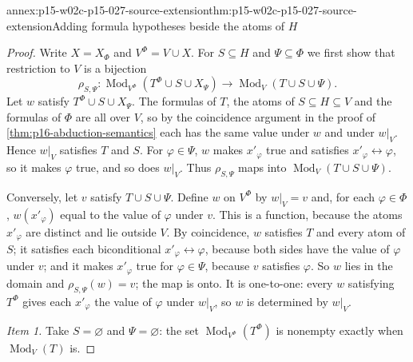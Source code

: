 \begin{annexitem}{annex:p15-w02c-p15-027-source-extension}{thm:p15-w02c-p15-027-source-extension}{Adding formula hypotheses beside the atoms of \texorpdfstring{\(H\)}{H}}
\begin{proof}
Write \(X=X_\Phi\) and \(V^{\Phi}=V\cup X\). For \(S\subseteq H\) and
\(\Psi\subseteq\Phi\) we first show that restriction to \(V\) is a
bijection
\[
 \rho_{S,\Psi}:\operatorname{Mod}_{V^{\Phi}}(T^{\Phi}\cup S\cup X_\Psi)
   \longrightarrow\operatorname{Mod}_V(T\cup S\cup\Psi).
\]
Let \(w\) satisfy \(T^{\Phi}\cup S\cup X_\Psi\). The formulas of \(T\),
the atoms of \(S\subseteq H\subseteq V\) and the formulas of \(\Phi\) are
all over \(V\), so by the coincidence argument in the proof of
\cref{thm:p16-abduction-semantics} each has the same value under \(w\) and
under \(w|_V\). Hence \(w|_V\) satisfies \(T\) and \(S\). For
\(\varphi\in\Psi\), \(w\) makes \(x'_\varphi\) true and satisfies
\(x'_\varphi\leftrightarrow\varphi\), so it makes \(\varphi\) true, and so
does \(w|_V\). Thus \(\rho_{S,\Psi}\) maps into
\(\operatorname{Mod}_V(T\cup S\cup\Psi)\).

Conversely, let \(v\) satisfy \(T\cup S\cup\Psi\). Define \(w\) on
\(V^{\Phi}\) by \(w|_V=v\) and, for each \(\varphi\in\Phi\),
\(w(x'_\varphi)\) equal to the value of \(\varphi\) under \(v\). This is a
function, because the atoms \(x'_\varphi\) are distinct and lie outside
\(V\). By coincidence, \(w\) satisfies \(T\) and every atom of \(S\); it
satisfies each biconditional \(x'_\varphi\leftrightarrow\varphi\),
because both sides have the value of \(\varphi\) under \(v\); and it makes
\(x'_\varphi\) true for \(\varphi\in\Psi\), because \(v\) satisfies
\(\varphi\). So \(w\) lies in the domain and \(\rho_{S,\Psi}(w)=v\); the
map is onto. It is one-to-one: every \(w\) satisfying \(T^{\Phi}\) gives
each \(x'_\varphi\) the value of \(\varphi\) under \(w|_V\), so \(w\) is
determined by \(w|_V\).

\emph{Item 1.} Take \(S=\varnothing\) and \(\Psi=\varnothing\): the set
\(\operatorname{Mod}_{V^{\Phi}}(T^{\Phi})\) is nonempty exactly when
\(\operatorname{Mod}_V(T)\) is.


\end{proof}
\end{annexitem}
